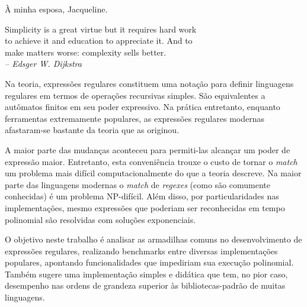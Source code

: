 \documentclass[a4paper,12pt,oneside,onecolumn]{uerj}
\begin{document}
\renewcommand*{\lstlistingname}{Listagem}
\renewcommand*{\lstlistlistingname}{Lista de listagens}
\frontmatter
\capa
\folhaderosto

%

\begin{folhadeaprovacao}
\end{folhadeaprovacao}


  \vfill\vfill
    \hfill À minha esposa, Jacqueline.
  \vfill


\pretextualchapter{}

  \vfill\vfill\vfill\vfill
  \begin{flushright}
     Simplicity is a great virtue but it requires hard work\\
     to achieve it and education to appreciate it. And to \\
     make matters worse: complexity sells better.\\
    \textsl{-- Edsger W. Dijkstra}
  \end{flushright}
  \vfill




Na teoria, expressões regulares constituem uma notação para definir linguagens regulares em termos de operações recursivas simples. São equivalentes a autômatos finitos em seu poder expressivo. Na prática entretanto, enquanto ferramentas extremamente populares, as expressões regulares modernas afastaram-se bastante da teoria que as originou. 

A maior parte das mudanças aconteceu para permiti-las alcançar um poder de expressão maior. Entretanto, esta conveniência trouxe o custo de tornar o \emph{match} um problema mais difícil computacionalmente do que a teoria descreve. Na maior parte das linguagens modernas o \emph{match} de \emph{regexes} (como são comumente conhecidas) é um problema NP-difícil. Além disso, por particularidades nas implementações, mesmo expressões que poderiam ser reconhecidas em tempo polinomial são resolvidas com soluções exponenciais. 

O objetivo neste trabalho é analisar as armadilhas comuns no desenvolvimento de expressões regulares, realizando benchmarks entre diversas implementações populares, apontando funcionalidades que impediriam sua execução polinomial. Também sugere uma implementação simples e didática que tem, no pior caso, desempenho nas ordens de grandeza superior às bibliotecas-padrão de muitas linguagens.
\end{document}
